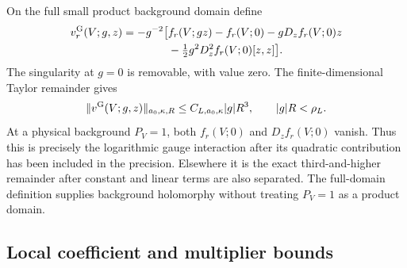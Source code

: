 \documentclass[11pt]{article}
\begin{document}
On the full small product background domain define
\begin{equation}\label{pm-gauge-remainder}
 \begin{split}
 v_r^{\rm G}(V;g,z)=-g^{-2}\bigl[
 &f_r(V;gz)-f_r(V;0)-gD_zf_r(V;0)z\\
 &-\tfrac12g^2D_z^2f_r(V;0)[z,z]\bigr].
 \end{split}
\end{equation}
The singularity at $g=0$ is removable, with value zero.
The finite-dimensional Taylor remainder gives
\begin{equation}\label{pm-gauge-bound}
 \|v^{\rm G}(V;g,z)\|_{a_0,\kappa,R}
 \le C_{L,a_0,\kappa}|g|R^3,
 \qquad |g|R<\rho_L.
\end{equation}
At a physical background $P_V=1$, both $f_r(V;0)$ and
$D_zf_r(V;0)$ vanish. Thus this is precisely the logarithmic
gauge interaction after its quadratic contribution has been
included in the precision. Elsewhere it is the exact
third-and-higher remainder after constant and linear terms
are also separated. The full-domain definition supplies
background holomorphy without treating $P_V=1$ as a product
domain.

\subsection{Local coefficient and multiplier bounds}
\label{pm-coefficients-section}
\end{document}
